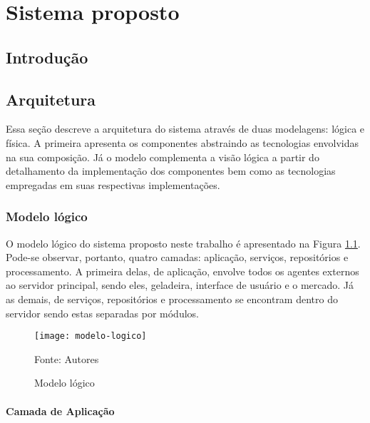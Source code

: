 \chapter{Sistema proposto}
\label{cap:sistema_proposto}

\section{Introdução}

\section{Arquitetura}

Essa seção descreve a arquitetura do sistema através de duas modelagens: lógica e física. A primeira apresenta os componentes abstraindo as tecnologias envolvidas na sua composição. Já o modelo complementa a visão lógica a partir do detalhamento da implementação dos componentes bem como as tecnologias empregadas em suas respectivas implementações.

\subsection{Modelo lógico}

O modelo lógico do sistema proposto neste trabalho é apresentado na Figura \ref{fig:c4_modelo_logico}. Pode-se observar, portanto, quatro camadas: aplicação, serviços, repositórios e processamento. A primeira delas, de aplicação, envolve todos os agentes externos ao servidor principal, sendo eles, geladeira, interface de usuário e o mercado. Já as demais, de serviços, repositórios e processamento se encontram dentro do servidor sendo estas separadas por módulos.


\begin{figure}[htb]
    \caption{Modelo lógico}
    \label{fig:c4_modelo_logico}
    \texttt{[image: modelo-logico]}
    
    Fonte: Autores
\end{figure}
\nocite{Freepik2017} %

\subsubsection{Camada de Aplicação}


